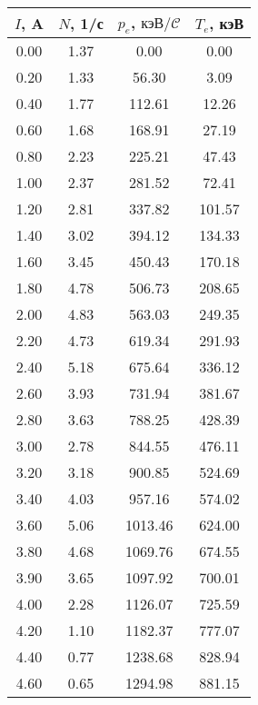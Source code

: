\begin{tabular}{cccc}
\toprule
$I$, A & $N$, 1/с & $p_e$, $\text{кэВ}/\mathcal{C}$ & $T_e$, кэВ \\
\midrule
0.00 & 1.37 & 0.00 & 0.00 \\
0.20 & 1.33 & 56.30 & 3.09 \\
0.40 & 1.77 & 112.61 & 12.26 \\
0.60 & 1.68 & 168.91 & 27.19 \\
0.80 & 2.23 & 225.21 & 47.43 \\
1.00 & 2.37 & 281.52 & 72.41 \\
1.20 & 2.81 & 337.82 & 101.57 \\
1.40 & 3.02 & 394.12 & 134.33 \\
1.60 & 3.45 & 450.43 & 170.18 \\
1.80 & 4.78 & 506.73 & 208.65 \\
2.00 & 4.83 & 563.03 & 249.35 \\
2.20 & 4.73 & 619.34 & 291.93 \\
2.40 & 5.18 & 675.64 & 336.12 \\
2.60 & 3.93 & 731.94 & 381.67 \\
2.80 & 3.63 & 788.25 & 428.39 \\
3.00 & 2.78 & 844.55 & 476.11 \\
3.20 & 3.18 & 900.85 & 524.69 \\
3.40 & 4.03 & 957.16 & 574.02 \\
3.60 & 5.06 & 1013.46 & 624.00 \\
3.80 & 4.68 & 1069.76 & 674.55 \\
3.90 & 3.65 & 1097.92 & 700.01 \\
4.00 & 2.28 & 1126.07 & 725.59 \\
4.20 & 1.10 & 1182.37 & 777.07 \\
4.40 & 0.77 & 1238.68 & 828.94 \\
4.60 & 0.65 & 1294.98 & 881.15 \\
\bottomrule
\end{tabular}
